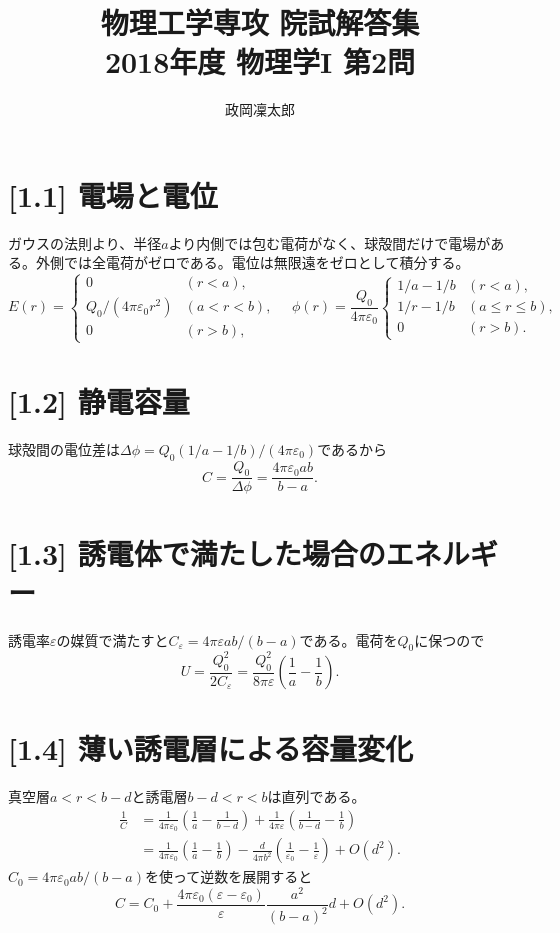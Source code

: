 \documentclass[11pt,a4paper]{article}
\title{物理工学専攻 院試解答集\\2018年度 物理学I 第2問}
\author{政岡凜太郎}
\date{}
\begin{document}
\maketitle

\section*{[1.1] 電場と電位}
ガウスの法則より、半径$a$より内側では包む電荷がなく、球殻間だけで電場がある。外側では全電荷がゼロである。電位は無限遠をゼロとして積分する。
\begin{equation}
 E(r)=\begin{cases}0&(r<a),\\ Q_0/(4\pi\varepsilon_0r^2)&(a<r<b),\\0&(r>b),\end{cases}\quad
 \phi(r)=\frac{Q_0}{4\pi\varepsilon_0}\begin{cases}1/a-1/b&(r<a),\\1/r-1/b&(a\le r\le b),\\0&(r>b).\end{cases}
\end{equation}

\section*{[1.2] 静電容量}
球殻間の電位差は$\Delta\phi=Q_0(1/a-1/b)/(4\pi\varepsilon_0)$であるから
\begin{equation}
 C=\frac{Q_0}{\Delta\phi}=\boxed{\frac{4\pi\varepsilon_0ab}{b-a}}.
\end{equation}

\section*{[1.3] 誘電体で満たした場合のエネルギー}
誘電率$\varepsilon$の媒質で満たすと$C_\varepsilon=4\pi\varepsilon ab/(b-a)$である。電荷を$Q_0$に保つので
\begin{equation}
 U=\frac{Q_0^2}{2C_\varepsilon}
 =\boxed{\frac{Q_0^2}{8\pi\varepsilon}\left(\frac1a-\frac1b\right)}.
\end{equation}

\section*{[1.4] 薄い誘電層による容量変化}
真空層$a<r<b-d$と誘電層$b-d<r<b$は直列である。
\begin{align}
 \frac1C&=\frac1{4\pi\varepsilon_0}\left(\frac1a-\frac1{b-d}\right)
 +\frac1{4\pi\varepsilon}\left(\frac1{b-d}-\frac1b\right)\\
 &=\frac1{4\pi\varepsilon_0}\left(\frac1a-\frac1b\right)
 -\frac{d}{4\pi b^2}\left(\frac1{\varepsilon_0}-\frac1\varepsilon\right)+O(d^2).
\end{align}
$C_0=4\pi\varepsilon_0ab/(b-a)$を使って逆数を展開すると
\begin{equation}
 \boxed{C=C_0+\frac{4\pi\varepsilon_0(\varepsilon-\varepsilon_0)}{\varepsilon}\frac{a^2}{(b-a)^2}d+O(d^2)}.
\end{equation}
\end{document}

